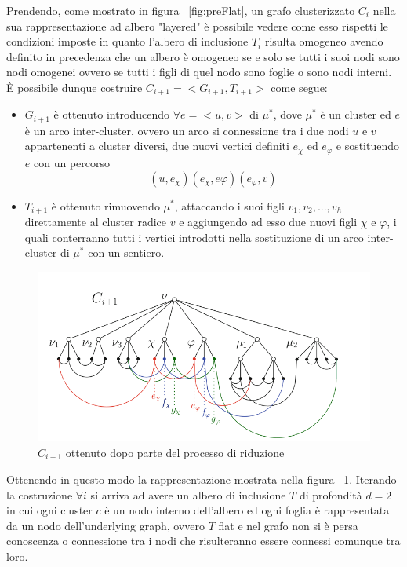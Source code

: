 {Prendendo, come mostrato in figura \figurename~\ref{fig:preFlat}, un grafo clusterizzato $C_i$ nella sua rappresentazione ad albero "layered" è possibile vedere come esso rispetti le condizioni imposte in quanto l'albero di inclusione $T_i$ risulta omogeneo avendo definito in precedenza che un albero è omogeneo se e solo se tutti i suoi nodi sono nodi omogenei ovvero se tutti i figli di quel nodo sono foglie o sono nodi interni. È possibile dunque costruire $C_{i+1} = <G_{i+1},T_{i+1}>$ come segue:
\begin{itemize}
	\item \textbf{$ G_{i+1} $} è ottenuto introducendo $\forall e=<u,v>$ di $\mu^*$, dove $\mu^*$ è un cluster ed $e$ è un arco inter-cluster, ovvero un arco si connessione tra i due nodi $u$ e $v$ appartenenti a cluster diversi, due nuovi vertici definiti $e_\chi$ ed $e_\varphi$ e sostituendo $e$ con un percorso $$(u, e_\chi)(e_\chi, e\varphi) (e_\varphi, v)$$
	\item \textbf{$T_{i+1}$} è ottenuto rimuovendo $\mu^*$, attaccando i suoi figli $v_1, v_2,. . . , v_h$ direttamente al cluster radice $v$ e aggiungendo ad esso due nuovi figli $\chi$ e $\varphi$, i quali conterranno tutti i vertici introdotti nella sostituzione di un arco inter-cluster di  $\mu^*$ con un sentiero.
\end{itemize}
\begin{figure}[!htb]
	\begin{center}
		\includegraphics[width=1 \linewidth]{figure/postFlat}
	\end{center}
	\caption{$C_{i+1}$ ottenuto dopo parte del processo di riduzione \label{fig:postFlat}}
\end{figure}
Ottenendo in questo modo la rappresentazione mostrata nella figura \figurename~\ref{fig:postFlat}.
\newpage
Iterando la costruzione $\forall i$ si arriva ad avere un albero di inclusione $T$ di profondità $d=2$ in cui ogni cluster $c$ è un nodo interno dell'albero ed ogni foglia è rappresentata da un nodo dell'underlying graph, ovvero $T$ flat e nel grafo non si è persa conoscenza o connessione tra i nodi che risulteranno essere connessi comunque tra loro.
}
